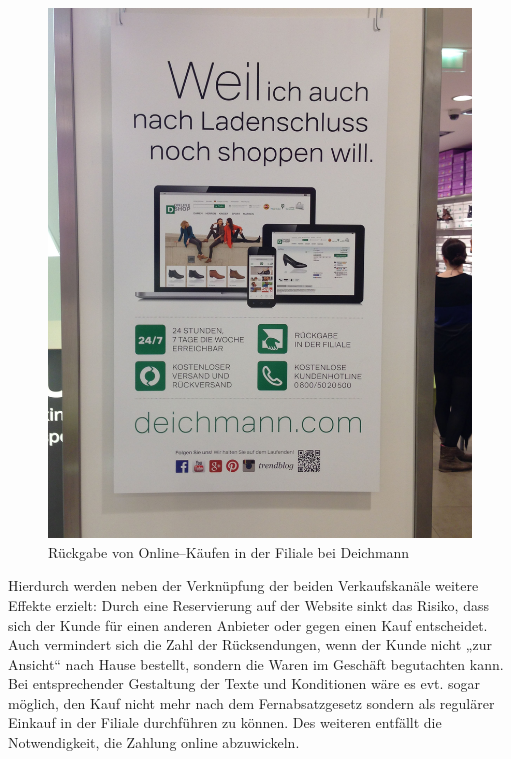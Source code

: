\begin{minipage}[t]{0.4\textwidth}
\begin{figure}[H]
\begin{center}
\includegraphics[width=\textwidth]{Deichmann-Rueckgabe.jpg}
\caption{Rückgabe von Online--Käufen in der Filiale bei Deichmann}
\label{pic:deichmannab}
\end{center}
\end{figure}
\end{minipage}

Hierdurch werden neben der Verknüpfung der beiden Verkaufskanäle weitere Effekte erzielt: Durch eine Reservierung auf der Website sinkt das Risiko, dass sich der Kunde für einen anderen Anbieter oder gegen einen Kauf entscheidet. Auch vermindert sich die Zahl der Rücksendungen, wenn der Kunde nicht „zur Ansicht“ nach Hause bestellt, sondern die Waren im Geschäft begutachten kann. Bei entsprechender Gestaltung der Texte und Konditionen wäre es evt. sogar möglich, den Kauf nicht mehr nach dem Fernabsatzgesetz sondern als regulärer Einkauf in der Filiale durchführen zu können. Des weiteren entfällt die Notwendigkeit, die Zahlung online abzuwickeln.

